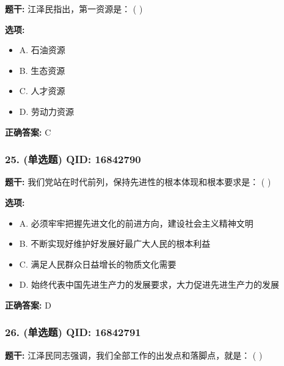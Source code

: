 \documentclass[12pt,UTF8]{ctexart}
\begin{document}
\textbf{题干:}
江泽民指出，第一资源是： ( )

\textbf{选项:}
\begin{itemize}[leftmargin=*]

  \item A. 石油资源

  \item B. 生态资源

  \item C. 人才资源

  \item D. 劳动力资源

\end{itemize}

\textbf{正确答案:}
C

\vspace{0.3em}\hrulefill\vspace{0.7em}

\subsubsection*{25. (单选题) \small QID: 16842790}

\textbf{题干:}
我们党站在时代前列，保持先进性的根本体现和根本要求是： ( )

\textbf{选项:}
\begin{itemize}[leftmargin=*]

  \item A. 必须牢牢把握先进文化的前进方向，建设社会主义精神文明

  \item B. 不断实现好维护好发展好最广大人民的根本利益

  \item C. 满足人民群众日益增长的物质文化需要

  \item D. 始终代表中国先进生产力的发展要求，大力促进先进生产力的发展

\end{itemize}

\textbf{正确答案:}
D

\vspace{0.3em}\hrulefill\vspace{0.7em}

\subsubsection*{26. (单选题) \small QID: 16842791}

\textbf{题干:}
江泽民同志强调，我们全部工作的出发点和落脚点，就是： ( )
\end{document}
